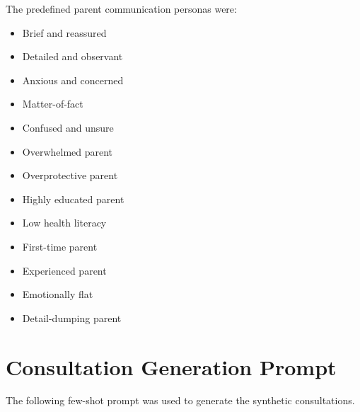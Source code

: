 \documentclass[ %
                    author={Aman Kumar Singh},
                supervisor={Dr. Edwin Simpson},
                    degree={MSc},
                     title={Quality-Aware Knowledge Distillation of Large Language Models for Efficient Personalised Clinical Report Generation},
                  subtitle={},
                      type={},
                      year={2021}]{dissertation}
\begin{document}
The predefined parent communication personas were:

\begin{multicols}{3}
\begin{itemize}
    \setlength{\itemsep}{0pt}
    \setlength{\parskip}{0pt}
    \setlength{\parsep}{0pt}
    
    \item Brief and reassured
    \item Detailed and observant
    \item Anxious and concerned
    \item Matter-of-fact
    \item Confused and unsure
    \item Overwhelmed parent
    \item Overprotective parent
    \item Highly educated parent
    \item Low health literacy
    \item First-time parent
    \item Experienced parent
    \item Emotionally flat
    \item Detail-dumping parent
\end{itemize}
\end{multicols}

\chapter{Consultation Generation Prompt}
\label{appx:consultation_prompt}

The following few-shot prompt was used to generate the synthetic consultations.
\end{document}
